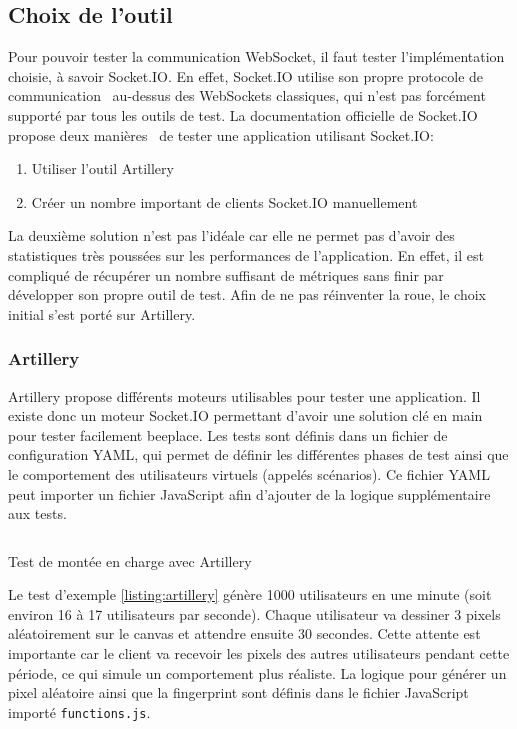 \subsection{Choix de l'outil}

Pour pouvoir tester la communication WebSocket, il faut tester l'implémentation choisie, à savoir Socket.IO. En effet, Socket.IO utilise son propre protocole de communication~\cite{socket-io-protocol} au-dessus des WebSockets classiques, qui n'est pas forcément supporté par tous les outils de test. La documentation officielle de Socket.IO propose deux manières~\cite{socket-io-load-testing} de tester une application utilisant Socket.IO:

\begin{enumerate}
  \item Utiliser l'outil Artillery~\cite{artillery}
  \item Créer un nombre important de clients Socket.IO manuellement
\end{enumerate}

La deuxième solution n'est pas l'idéale car elle ne permet pas d'avoir des statistiques très poussées sur les performances de l'application. En effet, il est compliqué de récupérer un nombre suffisant de métriques sans finir par développer son propre outil de test. Afin de ne pas réinventer la roue, le choix initial s'est porté sur Artillery.

\subsubsection{Artillery}

Artillery propose différents moteurs utilisables pour tester une application. Il existe donc un moteur Socket.IO permettant d'avoir une solution clé en main pour tester facilement \gls{beeplace}. Les tests sont définis dans un fichier de configuration YAML, qui permet de définir les différentes phases de test ainsi que le comportement des utilisateurs virtuels (appelés scénarios). Ce fichier YAML peut importer un fichier JavaScript afin d'ajouter de la logique supplémentaire aux tests.

\begin{listing}[h]
  \inputminted{yaml}{assets/figures/artillery-test.yml}
  \caption{Test de montée en charge avec Artillery}
  \label{listing:artillery}
\end{listing}

Le test d'exemple \ref{listing:artillery} génère 1000 utilisateurs en une minute (soit environ 16 à 17 utilisateurs par seconde). Chaque utilisateur va dessiner 3 pixels aléatoirement sur le canvas et attendre ensuite 30 secondes. Cette attente est importante car le client va recevoir les pixels des autres utilisateurs pendant cette période, ce qui simule un comportement plus réaliste. La logique pour générer un pixel aléatoire ainsi que la fingerprint sont définis dans le fichier JavaScript importé \texttt{functions.js}.


